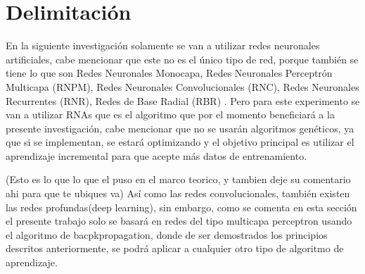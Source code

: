 \section{Delimitación}
\label{sec:delimitation}

    En la siguiente investigación solamente se van a utilizar redes neuronales artificiales, 
    cabe mencionar que este no es el único tipo de red, porque también se tiene lo que son Redes Neuronales Monocapa,
    Redes Neuronales Perceptrón Multicapa (RNPM), Redes Neuronales Convolucionales (RNC), Redes Neuronales Recurrentes (RNR),
    Redes de Base Radial (RBR) \cite{royo2021}. Pero para este experimento se van a utilizar RNAs que es el algoritmo que 
    por el momento beneficiar\'a a la presente investigación, cabe mencionar que no se usar\'an algoritmos genéticos, ya que si se implementan, se estará
    optimizando y el objetivo principal es utilizar el aprendizaje incremental para que acepte más datos de entrenamiento.
    
    (Esto es lo que lo que el puso en el marco teorico, y tambien deje su comentario ahi para que te ubiques va)
    Así como las redes convolucionales, también existen las redes profundas(deep learning), sin embargo, como se comenta en esta sección \label{sec:delimitation} el presente trabajo solo se basará en redes del tipo multicapa perceptron usando el algoritmo de bacpkpropagation, donde de ser demostrados los principios descritos anteriormente, se podrá aplicar a cualquier otro tipo de algoritmo de aprendizaje.